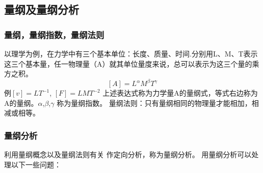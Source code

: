 \subsection{量纲及量纲分析   }
\subsubsection{量纲，量纲指数，量纲法则}
以理学为例，在力学中有三个基本单位：长度、质量、时间.分别用L、M、T表示这三个基本量，任一物理量（A）就其单位量度来说，总可以表示为这三个量的乘方之积。$$ [A]=L^\alpha M^\beta T^\gamma$$ 例$[v]=LT^{-1}$,  $[F]=LMT^{-2}$    
上述表达式称为力学量A的量纲式，等式右边称为A的量纲。$\alpha$,$\beta$,$ \gamma $ 称为量纲指数。  
量纲法则：只有量纲相同的物理量才能相加，相减或相等。

\subsubsection{量纲分析}
 利用量纲概念以及量纲法则有关     作定向分析，称为量纲分析。  
 用量纲分析可以处理以下一些问题：
